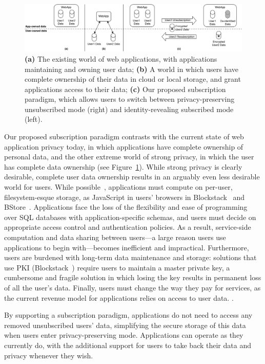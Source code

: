 \begin{figure}[ht!]
    \centering
    \includegraphics[width=\textwidth]{img/worlds}

    \caption{\textbf{(a)} The existing world of web applications, with applications maintaining and
    owning user data; \textbf{(b)} A world in which users have complete ownership of their data in cloud or local
    storage, and grant applications access to their data;
    \textbf{(c)} Our proposed subscription paradigm, which allows users to switch between privacy-preserving unsubscribed mode (right) and identity-revealing subscribed mode (left).}
    \label{fig:world}
\end{figure}

Our proposed subscription paradigm contrasts with the current state of web application privacy today,
in which applications have complete ownership of personal data, and the other extreme world of
strong privacy, in which the user has complete data ownership (see Figure~\ref{fig:world}).  While
strong privacy is clearly desirable, complete user data ownership results in an arguably even less
desirable world for users. While possible~\cite{amber, w5, blockstack, bstore}, applications
must compute on per-user, filesystem-esque storage, \eg as JavaScript in users' browsers in
Blockstack~\cite{blockstack} and BStore~\cite{bstore}. Applications face the loss of the flexibility
and ease of programming over SQL databases with application-specific schemas, and users must decide
on appropriate access control and authentication policies. As a result, service-side computation and
data sharing between users---a large reason users use applications to begin with---becomes
inefficient and impractical. 
%
Furthermore, users are burdened with long-term data maintenance and storage: solutions that use PKI
(\eg Blockstack~\cite{blockstack}) require users to maintain a
master private key, a cumbersome and fragile solution in which losing the key results in permanent
loss of all the user's data.
%
Finally, users must change the way they pay for services, as the current revenue model for
applications relies on access to user data. 
.

By supporting a subscription paradigm, applications do not need to access any removed unsubscribed users' data,
simplifying the secure storage of this data when users enter privacy-preserving mode. Applications
can operate as they currently do, with the additional support for users to take back their data and
privacy whenever they wish.

